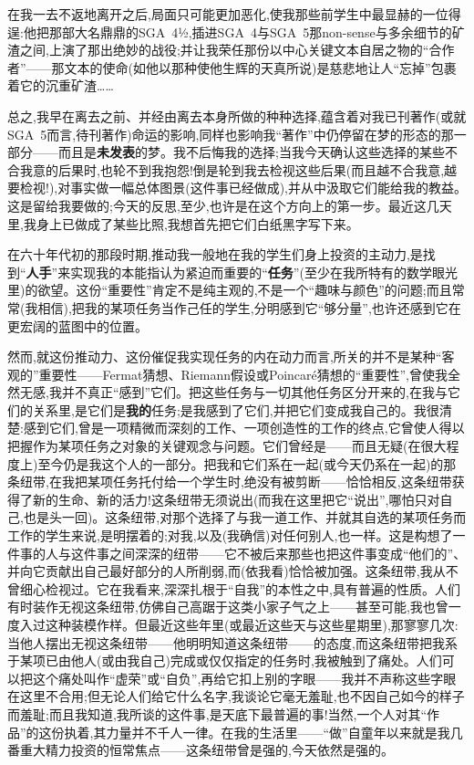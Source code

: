 在我一去不返地离开之后,局面只可能更加恶化,使我那些前学生中最显赫的一位得逞:他把那部大名鼎鼎的SGA~4½,插进SGA~4与SGA~5那non-sense与多余细节的矿渣之间,上演了那出绝妙的战役;并让我荣任那份以中心关键文本自居之物的“合作者”——那文本的使命(如他以那种使他生辉的天真所说)是慈悲地让人“忘掉”包裹着它的沉重矿渣……

\dmark{}总之,我早在离去之前、并经由离去本身所做的种种选择,蕴含着对我已刊著作(或就SGA~5而言,待刊著作)命运的影响,同样也影响我“著作”中仍停留在梦的形态的那一部分——而且是\textbf{未发表}的梦。我不后悔我的选择;当我今天确认这些选择的某些不合我意的后果时,也轮不到我抱怨!倒是轮到我去检视这些后果(而且越不合我意,越要检视!),对事实做一幅总体图景(这件事已经做成),并从中汲取它们能给我的教益。这是留给我要做的;今天的反思,至少,也许是在这个方向上的第一步。最近这几天里,我身上已做成了某些比照,我想首先把它们白纸黑字写下来。

在六十年代初的那段时期,推动我一般地在我的学生们身上投资的主动力,是找到“\textbf{人手}”来实现我的本能指认为紧迫而重要的“\textbf{任务}”(至少在我所特有的数学眼光里)的欲望。这份“重要性”肯定不是纯主观的,不是一个“趣味与颜色”的问题;而且常常(我相信),把我的某项任务当作己任的学生,分明感到它“够分量”,也许还感到它在更宏阔的蓝图中的位置。

然而,就这份推动力、这份催促我实现任务的内在动力而言,所关的并不是某种“客观的”重要性——Fermat猜想、Riemann假设或Poincaré猜想的“重要性”,曾使我全然无感,我并不真正“感到”它们。把这些任务与一切其他任务区分开来的,在我与它们的关系里,是它们是\textbf{我的}任务;是我感到了它们,并把它们变成我自己的。我很清楚:感到它们,曾是一项精微而深刻的工作、一项创造性的工作的终点,它曾使人得以把握作为某项任务之对象的关键观念与问题。它们曾经是——而且无疑(在很大程度上)至今仍是我这个人的一部分。把我和它们系在一起(或今天仍系在一起)的那条纽带,在我把某项任务托付给一个学生时,绝没有被剪断——恰恰相反,这条纽带获得了新的生命、新的活力!这条纽带无须说出\dmark{}(而我在这里把它“说出”,哪怕只对自己,也是头一回)。这条纽带,对那个选择了与我一道工作、并就其自选的某项任务而工作的学生来说,是明摆着的;对我,以及(我确信)对任何别人,也一样。这是构想了一件事的人与这件事之间深深的纽带——它不被后来那些也把这件事变成“他们的”、并向它贡献出自己最好部分的人所削弱,而(依我看)恰恰被加强。这条纽带,我从不曾细心检视过。它在我看来,深深扎根于“自我”的本性之中,具有普遍的性质。人们有时装作无视这条纽带,仿佛自己高踞于这类小家子气之上——甚至可能,我也曾一度入过这种装模作样。但最近这些年里(或最近这些天与这些星期里),那寥寥几次:当他人摆出无视这条纽带——他明明知道这条纽带——的态度,而这条纽带把我系于某项已由他人(或由我自己)完成或仅仅指定的任务时,我被触到了痛处。人们可以把这个痛处叫作“虚荣”或“自负”,再给它扣上别的字眼——我并不声称这些字眼在这里不合用;但无论人们给它什么名字,我谈论它毫无羞耻,也不因自己如今的样子而羞耻;而且我知道,我所谈的这件事,是天底下最普遍的事!当然,一个人对其“作品”的这份执着,其力量并不千人一律。在我的生活里——“做”自童年以来就是我几番重大精力投资的恒常焦点——这条纽带曾是强的,今天依然是强的。

